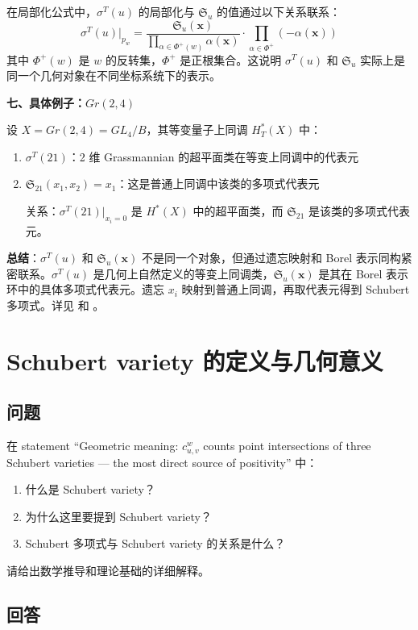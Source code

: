 在局部化公式中，$\sigma^T(u)$ 的局部化与 $\mathfrak{S}_u$ 的值通过以下关系联系：
$$\sigma^T(u)|_{p_w} = \frac{\mathfrak{S}_u(\mathbf{x})}{\prod_{\alpha \in \Phi^+(w)} \alpha(\mathbf{x})} \cdot \prod_{\alpha \in \Phi^+} (-\alpha(\mathbf{x}))$$
其中 $\Phi^+(w)$ 是 $w$ 的反转集，$\Phi^+$ 是正根集合。这说明 $\sigma^T(u)$ 和 $\mathfrak{S}_u$ 实际上是同一个几何对象在不同坐标系统下的表示。

\textbf{七、具体例子：$Gr(2,4)$}

设 $X = Gr(2,4) = GL_4/B$，其等变量子上同调 $H_T^*(X)$ 中：

\begin{enumerate}
\item $\sigma^T(21)$：2 维 Grassmannian 的超平面类在等变上同调中的代表元
\item $\mathfrak{S}_{21}(x_1,x_2) = x_1$：这是普通上同调中该类的多项式代表元

关系：$\sigma^T(21)|_{x_i=0}$ 是 $H^*(X)$ 中的超平面类，而 $\mathfrak{S}_{21}$ 是该类的多项式代表元。
\end{enumerate}

\textbf{总结}：$\sigma^T(u)$ 和 $\mathfrak{S}_u(\mathbf{x})$ 不是同一个对象，但通过遗忘映射和 Borel 表示同构紧密联系。$\sigma^T(u)$ 是几何上自然定义的等变上同调类，$\mathfrak{S}_u(\mathbf{x})$ 是其在 Borel 表示环中的具体多项式代表元。遗忘 $x_i$ 映射到普通上同调，再取代表元得到 Schubert 多项式。详见 \cite[Chapter 1]{macdonald1991} 和 \cite[Chapter 10]{FultonQuntum1997}。

\section{Schubert variety 的定义与几何意义}\label{sec:qa-schubert-variety}
\subsection{问题}
在 statement ``Geometric meaning: $c_{u,v}^w$ counts point intersections of three Schubert varieties --- the most direct source of positivity'' 中：
\begin{enumerate}
\item 什么是 Schubert variety？
\item 为什么这里要提到 Schubert variety？
\item Schubert 多项式与 Schubert variety 的关系是什么？
\end{enumerate}
请给出数学推导和理论基础的详细解释。

\subsection{回答}

